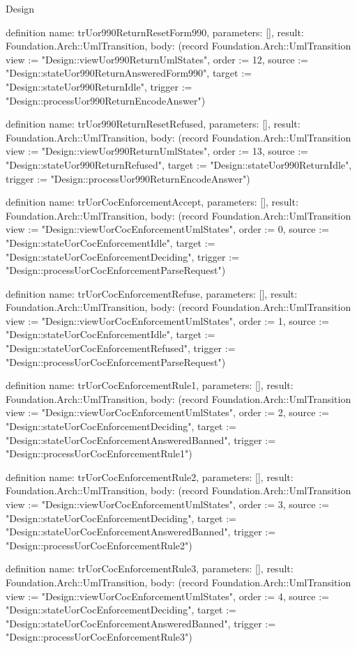 \begin{lexlean}{Design}
\begin{semanticmodule}
definition{
  name: trUor990ReturnResetForm990,
  parameters: [],
  result: Foundation.Arch::UmlTransition,
  body: (record Foundation.Arch::UmlTransition {view := "Design::viewUor990ReturnUmlStates", order := 12, source := "Design::stateUor990ReturnAnsweredForm990", target := "Design::stateUor990ReturnIdle", trigger := "Design::processUor990ReturnEncodeAnswer"})
}

definition{
  name: trUor990ReturnResetRefused,
  parameters: [],
  result: Foundation.Arch::UmlTransition,
  body: (record Foundation.Arch::UmlTransition {view := "Design::viewUor990ReturnUmlStates", order := 13, source := "Design::stateUor990ReturnRefused", target := "Design::stateUor990ReturnIdle", trigger := "Design::processUor990ReturnEncodeAnswer"})
}

definition{
  name: trUorCocEnforcementAccept,
  parameters: [],
  result: Foundation.Arch::UmlTransition,
  body: (record Foundation.Arch::UmlTransition {view := "Design::viewUorCocEnforcementUmlStates", order := 0, source := "Design::stateUorCocEnforcementIdle", target := "Design::stateUorCocEnforcementDeciding", trigger := "Design::processUorCocEnforcementParseRequest"})
}

definition{
  name: trUorCocEnforcementRefuse,
  parameters: [],
  result: Foundation.Arch::UmlTransition,
  body: (record Foundation.Arch::UmlTransition {view := "Design::viewUorCocEnforcementUmlStates", order := 1, source := "Design::stateUorCocEnforcementIdle", target := "Design::stateUorCocEnforcementRefused", trigger := "Design::processUorCocEnforcementParseRequest"})
}

definition{
  name: trUorCocEnforcementRule1,
  parameters: [],
  result: Foundation.Arch::UmlTransition,
  body: (record Foundation.Arch::UmlTransition {view := "Design::viewUorCocEnforcementUmlStates", order := 2, source := "Design::stateUorCocEnforcementDeciding", target := "Design::stateUorCocEnforcementAnsweredBanned", trigger := "Design::processUorCocEnforcementRule1"})
}

definition{
  name: trUorCocEnforcementRule2,
  parameters: [],
  result: Foundation.Arch::UmlTransition,
  body: (record Foundation.Arch::UmlTransition {view := "Design::viewUorCocEnforcementUmlStates", order := 3, source := "Design::stateUorCocEnforcementDeciding", target := "Design::stateUorCocEnforcementAnsweredBanned", trigger := "Design::processUorCocEnforcementRule2"})
}

definition{
  name: trUorCocEnforcementRule3,
  parameters: [],
  result: Foundation.Arch::UmlTransition,
  body: (record Foundation.Arch::UmlTransition {view := "Design::viewUorCocEnforcementUmlStates", order := 4, source := "Design::stateUorCocEnforcementDeciding", target := "Design::stateUorCocEnforcementAnsweredBanned", trigger := "Design::processUorCocEnforcementRule3"})
}


\end{semanticmodule}
\end{lexlean}
